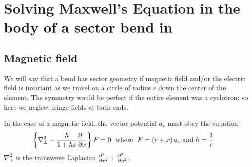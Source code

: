 \makeusother

\chapter{Solving Maxwell's Equation in the body of a sector bend in \PTC\  }
\label{app:max}


%

\resetptclinenumber
{}


\section{Magnetic field}


We will say that a bend has sector geometry if magnetic field and/or the electric field is invariant as we travel on a circle of radius $r$ down the center of the
element. The symmetry would be perfect if the entire element was a cyclotron; so here we neglect fringe fields at both ends.

In the case of a magnetic field, the vector potential $a_s$ must obey the equation:
%
%
\begin{eqnarray}\left\{{{\nabla }_{\perp }^{2}-{h \over 1+hx}{\partial \hphantom{x} \over \partial x}}\right\}F&=0~~{\rm w}{\rm h}{\rm e}{\rm r}{\rm e}~~F=\left({r+x}\right){a}_{s}~{\rm a}{\rm n}{\rm d} ~h=
{1 \over r}\label{eq:maxb}\end{eqnarray}
%
%
%
${\nabla }_{\perp }^{2}$
is the transverse Laplacian %
${{\partial }^{2}\hphantom{x} \over {\partial x}^{2}}+{{\partial }^{2}\hphantom{x} \over {\partial y}^{2}}$.

